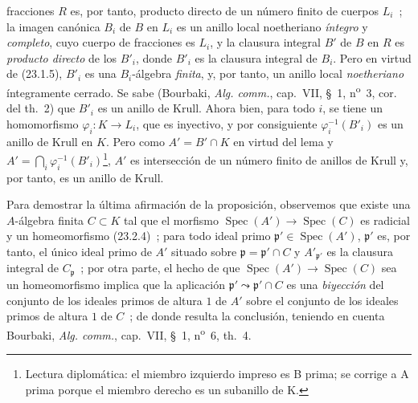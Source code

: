 \documentclass[10pt,oneside]{book}
\begin{document}
fracciones $R$ es, por tanto, producto directo de un número finito de cuerpos $L_i$~;
la imagen canónica $B_i$ de $B$ en $L_i$ es un anillo local noetheriano
\emph{íntegro} y \emph{completo}, cuyo cuerpo de fracciones es $L_i$, y la
clausura integral $B'$ de $B$ en $R$ es \emph{producto directo} de los
$B'_i$, donde $B'_i$ es la clausura integral de $B_i$. Pero en virtud de
(23.1.5), $B'_i$ es una $B_i$-álgebra \emph{finita}, y, por tanto, un anillo local
\emph{noetheriano} íntegramente cerrado. Se sabe (Bourbaki,
\emph{Alg. comm.}, cap.~VII, §~1, n\textsuperscript{o}~3, cor. del th.~2) que
$B'_i$ es un anillo de Krull. Ahora bien, para todo $i$, se tiene un homomorfismo
$\varphi_i:K\to L_i$, que es inyectivo, y por consiguiente
$\varphi_i^{-1}(B'_i)$ es un anillo de Krull en $K$. Pero como
$A'=B'\cap K$ en virtud del lema y
$A'=\bigcap_i\varphi_i^{-1}(B'_i)$\footnote{Lectura diplomática: el miembro izquierdo impreso es B prima; se corrige a A prima porque el miembro derecho es un subanillo de K.}, $A'$ es intersección de un número finito
de anillos de Krull y, por tanto, es un anillo de Krull.

Para demostrar la última afirmación de la proposición, observemos que existe una
$A$-álgebra finita $C\subset K$ tal que el morfismo
$\operatorname{Spec}(A')\to\operatorname{Spec}(C)$ es radicial y un
homeomorfismo (23.2.4)~; para todo ideal primo
$\mathfrak p'\in\operatorname{Spec}(A')$, $\mathfrak p'$ es, por tanto, el único
ideal primo de $A'$ situado sobre $\mathfrak p=\mathfrak p'\cap C$ y
$A'_{\mathfrak p'}$ es la clausura integral de $C_{\mathfrak p}$~; por otra parte,
el hecho de que $\operatorname{Spec}(A')\to\operatorname{Spec}(C)$ sea un
homeomorfismo implica que la aplicación
$\mathfrak p'\leadsto\mathfrak p'\cap C$ es una \emph{biyección} del conjunto de los
ideales primos de altura $1$ de $A'$ sobre el conjunto de los ideales primos de
altura $1$ de $C$~; de donde resulta la conclusión, teniendo en cuenta Bourbaki,
\emph{Alg. comm.}, cap.~VII, §~1, n\textsuperscript{o}~6, th.~4.
\end{document}
